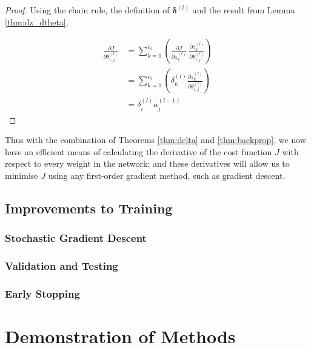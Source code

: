 \documentclass{article}[11pt]
\begin{document}
        \begin{proof}
        
            Using the chain rule, the definition of $\boldsymbol{\delta}^{(l)}$ and the result from Lemma \ref{thm:dz_dtheta},
            
            $$ \begin{aligned}
            \frac{\partial J}{\partial \theta^{(l)}_{i,j}}
            &= \sum_{k=1}^{n_l} \left( \frac{\partial J}{\partial z^{(l)}_k} \ \frac{\partial z^{(l)}_k}{\partial \theta^{(l)}_{i,j}} \right) \\
            &= \sum_{k=1}^{n_l} \left( \delta^{(l)}_k \frac{\partial z^{(l)}_k}{\partial \theta^{(l)}_{i,j}} \right) \\
            &= \delta^{(l)}_i a^{(l-1)}_j
            \end{aligned}$$
        
        \end{proof}
        
        
        Thus with the combination of Theorems \ref{thm:delta} and \ref{thm:backprop}, we now have an efficient means of calculating the derivative of the cost function $J$ with respect to every weight in the network; and these derivatives will allow us to minimise $J$ using any first-order gradient method, such as gradient descent.
        



    \subsection{Improvements to Training}
        
        
        \subsubsection{Stochastic Gradient Descent}
        
        \subsubsection{Validation and Testing}



        \subsubsection{Early Stopping}




\section{Demonstration of Methods} \label{sec:demos}
\end{document}
